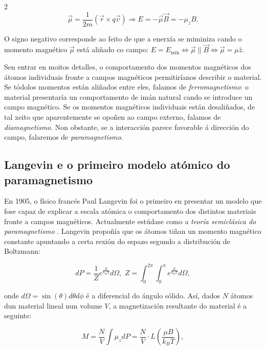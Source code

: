 \begin{refsection}
\begin{multicols}{2}
\begin{equation}\label{ec.: energia_momento}
    \vec \mu = \frac{1}{2m}(\vec r\times q\vec v)\Longrightarrow E =
    -\vec \mu\vec B = -\mu_zB.
\end{equation}

O signo negativo corresponde ao feito de que a enerxía se miminiza cando o
momento magnético $\vec \mu$ está aliñado co campo: $E=E_\mathrm{mín}
\Leftrightarrow \vec \mu \parallel \vec B \Leftrightarrow \vec \mu=\mu \hat z$.

Sen entrar en moitos detalles, o comportamento dos momentos magnéticos dos
átomos individuais fronte a campos magnéticos permitiríanos describir o
material. Se tódolos momentos están aliñados entre eles, falamos de
\emph{ferromagnetismo}: o material presentaría un comportamento de imán natural
cando se introduce un campo magnético. Se os momentos magnéticos individuais
están desaliñados, de tal xeito que aparentemente se opoñen ao campo externo,
falamos de \emph{diamagnetismo}. Non obstante, se a interacción parece favorable
á dirección do campo, falaremos de \emph{paramagnetismo}.

\subsection*{Langevin e o primeiro modelo atómico do paramagnetismo}

En 1905, o físico francés Paul Langevin foi o primeiro en presentar un modelo
que fose capaz de explicar a escala atómica o comportamento dos distintos
materiais fronte a campos magnéticos. Actualmente estúdase como a \emph{teoría
semiclásica do paramagnetismo} \cite[Sec. 2.1.4.]{blundell.s_2001}. Langevin
propoñía que os átomos tiñan un momento magnético constante apuntando a certa
rexión do espazo segundo a distribución de Boltzmann:

\begin{equation}\label{ec.: bvl_boltzmann}
    dP = \frac{1}{Z}e^{\frac{E}{k_B T}}d\Omega,\,\, Z
    =\int_{0}^{2\pi}\int_{0}^{\pi}e^{\frac{E}{k_B T}}d\Omega,
\end{equation}

onde $d\Omega = \sin(\theta)d\theta d\phi$ é a diferencial do ángulo sólido.
Así, dados $N$ átomos dun material lineal nun volume $V$, a magnetización
resultante do material é a seguinte:

\begin{equation}\label{ec.: blv_langevin}
    M = \frac{N}{V} \int\mu_zdP = \frac{N}{V}\cdot
    L\left(\frac{\mu B}{k_B T}\right),
\end{equation}


\end{multicols}
\end{refsection}
